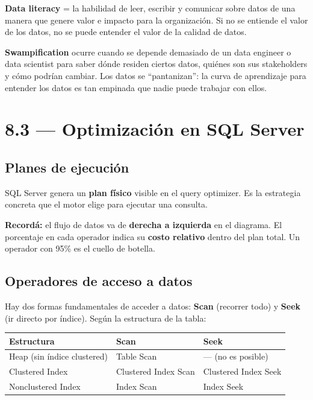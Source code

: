 \documentclass[11pt, a4paper]{article}
\begin{document}
\textbf{Data literacy} = la habilidad de leer, escribir y comunicar sobre datos de una manera que genere valor e impacto para la organización. Si no se entiende el valor de los datos, no se puede entender el valor de la calidad de datos.

\textbf{Swampification} ocurre cuando se depende demasiado de un data engineer o data scientist para saber dónde residen ciertos datos, quiénes son sus stakeholders y cómo podrían cambiar. Los datos se ``pantanizan'': la curva de aprendizaje para entender los datos es tan empinada que nadie puede trabajar con ellos.

\section{8.3 — Optimización en SQL Server}

\subsection{Planes de ejecución}

SQL Server genera un \textbf{plan físico} visible en el query optimizer. Es la estrategia concreta que el motor elige para ejecutar una consulta.

\begin{recallbox}
	\textbf{Recordá:} el flujo de datos va de \textbf{derecha a izquierda} en el diagrama. El porcentaje en cada operador indica su \textbf{costo relativo} dentro del plan total. Un operador con 95\% es el cuello de botella.
\end{recallbox}

\subsection{Operadores de acceso a datos}

Hay dos formas fundamentales de acceder a datos: \textbf{Scan} (recorrer todo) y \textbf{Seek} (ir directo por índice). Según la estructura de la tabla:

\begin{tabularx}{\textwidth}{@{}lXX@{}}
	\toprule
	\textbf{Estructura}         & \textbf{Scan}        & \textbf{Seek}        \\
	\midrule
	Heap (sin índice clustered) & Table Scan           & — (no es posible)    \\
	Clustered Index             & Clustered Index Scan & Clustered Index Seek \\
	Nonclustered Index          & Index Scan           & Index Seek           \\
	\bottomrule
\end{tabularx}
\end{document}
